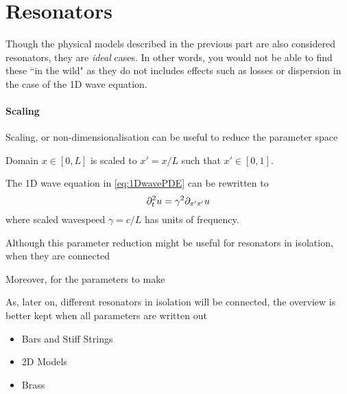 \chapter*{Resonators}
Though the physical models described in the previous part are also considered resonators, they are \textit{ideal} cases. In other words, you would not be able to find these ``in the wild" as they do not includes effects such as losses or dispersion in the case of the 1D wave equation.  

\subsubsection{Scaling}
Scaling, or non-dimensionalisation can be useful to reduce the parameter space

Domain $x\in[0, L]$ is scaled to $x' = x/L$ such that $x' \in [0, 1]$.

The 1D wave equation in \eqref{eq:1DwavePDE} can be rewritten to
\begin{equation}
    \partial_t^2 u = \gamma^2\partial_{x'x'}u
\end{equation}
where scaled wavespeed $\gamma = c/L$ has units of frequency.

Although this parameter reduction might be useful for resonators in isolation, when they are connected 

Moreover, for the parameters to make

As, later on, different resonators in isolation will be connected, the overview is better kept when all parameters are written out


\begin{itemize}
    \item Bars and Stiff Strings
    \item 2D Models
    \item Brass
\end{itemize}